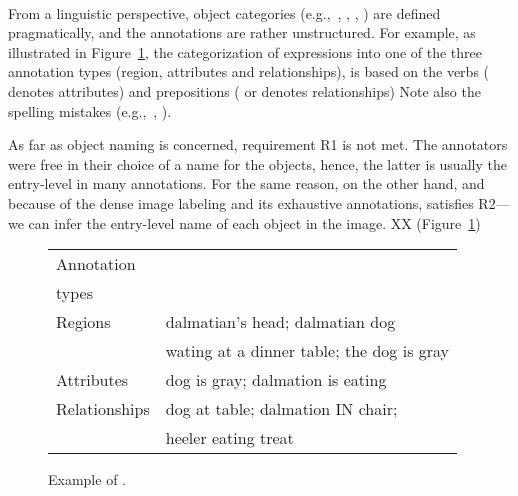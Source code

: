 {\paragraph{\vgenome}
From a linguistic perspective, object categories (e.g.,~, , , ) are defined pragmatically, and the annotations are rather unstructured. 
For example, as illustrated in Figure~\ref{fig:ex_visualgenome}, the categorization of expressions into one of the three annotation types (region, attributes and relationships), is based on the verbs ( denotes attributes) and prepositions ( or  denotes relationships) 
Note also the spelling mistakes (e.g.,~, ). 

As far as object naming is concerned, requirement R1 is not met.    
The annotators were free in their choice of a name for the objects, hence, the latter is usually the entry-level in many annotations. 
For the same reason, on the other hand, and because of the dense image labeling and its exhaustive annotations, \vgenome satisfies R2---we can infer the entry-level name of each object in the image. XX (Figure~\ref{fig:ex_visualgenome})\\


\begin{figure}[t]
	\begin{center}
	\begin{minipage}{.33\textwidth}
	\end{minipage}
	\begin{minipage}{.65\textwidth}
		\begin{tabular}{l|l}
			\hline
			Annotation	& \\	
			types		& 	\\
			\hline \hline
			Regions &  dalmatian's head; dalmatian dog\\
					& wating at a dinner table; the dog is gray\\
			Attributes & dog is gray; dalmation is eating\\
			Relationships & dog at table; dalmation IN chair; \\
							& heeler eating treat \\
							\hline
		\end{tabular}
	\end{minipage}
	\caption{Example of \vgenome. \label{fig:ex_visualgenome}}
	\end{center}
\end{figure}


}
